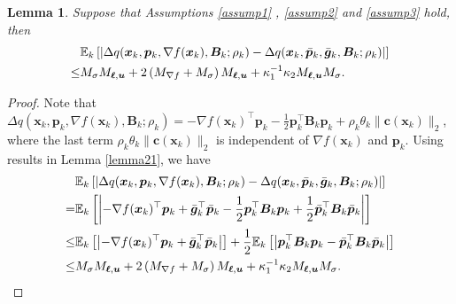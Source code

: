 \documentclass[aos]{imsart}
\numberwithin{equation}{section}
\theoremstyle{plain}
\newtheorem{lemma}{Lemma}
\begin{document}
\begin{appendix}
\begin{lemma}
\label{lemma22}
    Suppose that Assumptions \ref{assump1} , \ref{assump2} and \ref{assump3} hold, then
    \begin{equation}
    \begin{split}
        & \mathbb{E}_k \left[ \left|\Delta q(\bm{x}_k,\bm{p}_k,\nabla f(\bm{x}_k),\bm{B}_k;\rho_k) - \Delta q(\bm{x}_k,\Bar{\bm{p}}_k,\Bar{\bm{g}}_{k},\bm{B}_k;\rho_k) \right| \right] \\
        \leq & M_{\sigma} M_{\bm{\ell},\bm{u}} + 2 \left(M_{\nabla f} + M_{\sigma} \right)  M_{\bm{\ell},\bm{u}} + \kappa_1^{-1} \kappa_2 M_{\bm{\ell},\bm{u}} M_{\sigma}.
    \end{split}
    \end{equation}
\end{lemma}

\begin{proof}
    Note that $\Delta q(\bm{x}_k,\bm{p}_k,\nabla f(\bm{x}_k),\bm{B}_k;\rho_k) =  -\nabla f(\bm{x}_k)^{\top} \bm{p}_k - \frac{1}{2} \bm{p}_k^{\top} \bm{B}_k \bm{p}_k + \rho_k \theta_k \|\bm{c}(\bm{x}_k)\|_2$, where the last term $\rho_k \theta_k \|\bm{c}(\bm{x}_k)\|_2$ is independent of $\nabla f(\bm{x}_k)$ and $\bm{p}_k $. Using results in Lemma \ref{lemma21}, we have
    \begin{equation*}
        \begin{split}
            & \mathbb{E}_k \left[ \left| \Delta q(\bm{x}_k,\bm{p}_k,\nabla f(\bm{x}_k),\bm{B}_k;\rho_k) - \Delta q(\bm{x}_k,\Bar{\bm{p}}_k,\Bar{\bm{g}}_{k},\bm{B}_k;\rho_k) \right| \right] \\
            = & \mathbb{E}_k \left[ \left|-\nabla f(\bm{x}_k)^{\top} \bm{p}_k +  \Bar{\bm{g}}_{k}^{\top} \Bar{\bm{p}}_k - \frac{1}{2}\bm{p}_k^{\top} \bm{B}_k \bm{p}_k + \frac{1}{2} \Bar{\bm{p}}_k^{\top} \bm{B}_k \Bar{\bm{p}}_k \right|\right] \\
            \leq & \mathbb{E}_k \left[ \left|-\nabla f(\bm{x}_k)^{\top} \bm{p}_k +  \Bar{\bm{g}}_{k}^{\top} \Bar{\bm{p}}_k  \right| \right] + \frac{1}{2} \mathbb{E}_k \left[ \left| \bm{p}_k^{\top} \bm{B}_k \bm{p}_k -  \Bar{\bm{p}}_k^{\top} \bm{B}_k \Bar{\bm{p}}_k  \right| \right] \\
            \leq & M_{\sigma} M_{\bm{\ell},\bm{u}} + 2 \left(M_{\nabla f} + M_{\sigma} \right)  M_{\bm{\ell},\bm{u}} + \kappa_1^{-1} \kappa_2 M_{\bm{\ell},\bm{u}} M_{\sigma}.
        \end{split}
    \end{equation*}
\end{proof}




\end{appendix}
\end{document}
